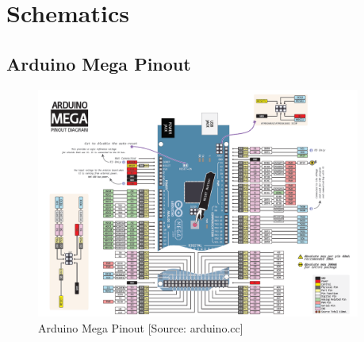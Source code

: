 \pagebreak
\section{Schematics}
\subsection{Arduino Mega Pinout} 
\label{megaPinout}
\begin{figure}[H]
	\centering
\includegraphics[angle=90,origin=c,width=0.95\textwidth]{figures/megaPinout.png}
	\caption{Arduino Mega Pinout [Source: arduino.cc]}
	\label{megaPinoutPic}
\end{figure}
